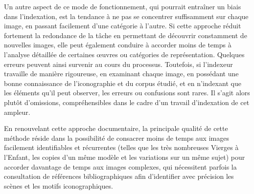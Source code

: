 Un autre aspect de ce mode de fonctionnement, qui pourrait entraîner un biais dans l’indexation, est la tendance à ne pas se concentrer suffisamment sur chaque image, en passant facilement d’une catégorie à l’autre. Si cette approche réduit fortement la redondance de la tâche en permettant de découvrir constamment de nouvelles images, elle peut également conduire à accorder moins de temps à l’analyse détaillée de certaines œuvres ou catégories de représentation. Quelques erreurs peuvent ainsi survenir au cours du processus. Toutefois, si l’indexeur travaille de manière rigoureuse, en examinant chaque image, en possédant une bonne connaissance de l’iconographie et du corpus étudié, et en n’indexant que les éléments qu’il peut observer, les erreurs ou confusions sont rares. Il s’agit alors plutôt d’omissions, compréhensibles dans le cadre d’un travail d’indexation de cet ampleur.

En renouvelant cette approche documentaire, la principale qualité de cette méthode réside dans la possibilité de consacrer moins de temps aux images facilement identifiables et récurrentes (telles que les très nombreuses Vierges à l’Enfant, les copies d’un même modèle et les variations sur un même sujet) pour accorder davantage de temps aux images complexes, qui nécessitent parfois la consultation de références bibliographiques afin d’identifier avec précision les scènes et les motifs iconographiques.
